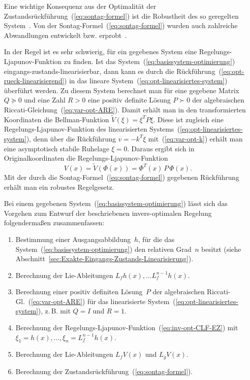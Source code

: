 Eine wichtige Konsequenz aus der Optimalität der Zustandsrückführung~(\ref{eq:sontag-formel})
ist die Robustheit des so geregelten System~\cite{freeman96control,freeman96siam,sepulchre97}.
Von der Sontag-Formel~(\ref{eq:sontag-formel}) wurden auch zahlreiche
Abwandlungen entwickelt bzw. erprobt~\cite{lin1991,malisoff2000scl,yu2001}.

\medskip{}

In der Regel ist es sehr schwierig, für ein gegebenes System eine
Regelungs-Ljapunov-Funktion zu finden. Ist das System~(\ref{eq:basissystem-optimierung})
eingangs-zustands-linearisierbar, dann kann es durch die Rückführung~(\ref{eq:opt-rueck-linearisierend})
in das lineare System~(\ref{eq:opt-linearisiertes-system}) überführt
werden. Zu diesem System berechnet man für eine gegebene Matrix $Q\succeq0$
und eine Zahl $R>0$ eine positiv definite Lösung $P\succ0$ der algebraischen
Riccati-Gleichung~(\ref{eq:var-opt-ARE}). Damit erhält man in den
transformierten Koordinaten die Bellman-Funktion $\widetilde{V}(\xi)=\xi^{T}P\xi$.
Diese ist zugleich eine Regelungs-Ljapunov-Funktion des linearisierten
Systems~(\ref{eq:opt-linearisiertes-system}), denn über die Rückführung
$v=-k^{T}\xi$ mit~(\ref{eq:var-opt-k}) erhält man eine asymptotisch
stabile Ruhelage $\xi=0$. Daraus ergibt sich in Originalkoordinaten
die Regelungs-Ljapunov-Funktion
\begin{equation}
V(x)=\widetilde{V}(\Phi(x))=\Phi^{T}(x)\,P\,\Phi(x).\label{eq:inv-opt-CLF-EZ}
\end{equation}
Mit der durch die Sontag-Formel~(\ref{eq:sontag-formel}) gegebenen
Rückführung erhält man ein robustes Regelgesetz. 

Bei einem gegebenen System~(\ref{eq:basissystem-optimierung}) lässt
sich das Vorgehen zum Entwurf der beschriebenen invers-optimalen Regelung
folgendermaßen zusammenfassen:
\begin{enumerate}
\item Bestimmung einer Ausgangsabbildung~$h$, für die das System~(\ref{eq:basissystem-optimierung})
den relativen Grad~$n$ besitzt (siehe Abschnitt~\ref{sec:Exakte-Eingangs-Zustands-Linearisierung}).
\item Berechnung der Lie-Ableitungen $L_{f}h(x),\ldots L_{f}^{n-1}h(x)$. 
\item Berechnung einer positiv definiten Lösung~$P$ der algebraischen
Riccati-Gl.~(\ref{eq:var-opt-ARE}) für das linearisierte System~(\ref{eq:opt-linearisiertes-system}),
z.\,B. mit $Q=I$ und $R=1$.
\item Berechnung der Regelungs-Ljapunov-Funktion~(\ref{eq:inv-opt-CLF-EZ})
mit $\xi_{1}=h(x),\ldots,\xi_{n}=L_{f}^{n-1}h(x)$.
\item Berechnung der Lie-Ableitungen $L_{f}V(x)$ und $L_{g}V(x)$.
\item Berechnung der Zustandsrückführung~(\ref{eq:sontag-formel}).
\end{enumerate}

